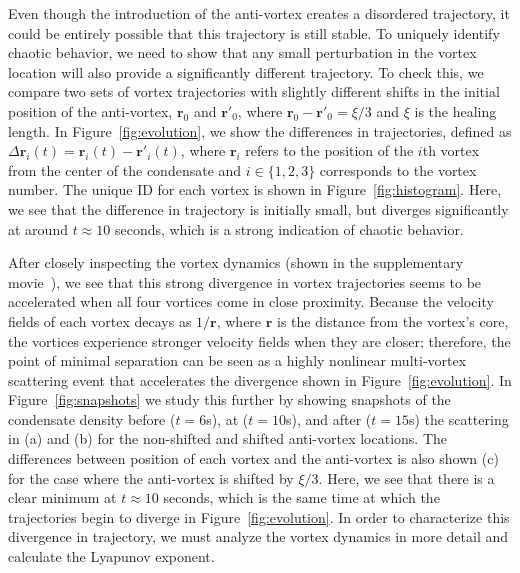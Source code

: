 Even though the introduction of the anti-vortex creates a disordered trajectory, it could be entirely possible that this trajectory is still stable.
To uniquely identify chaotic behavior, we need to show that any small perturbation in the vortex location will also provide a significantly different trajectory.
To check this, we compare two sets of vortex trajectories with slightly different shifts in the initial position of the anti-vortex, $\mathbf{r}_0$ and $\mathbf{r}'_0$, where $\mathbf{r}_0 - \mathbf{r}'_0 = \xi/3$ and $\xi$ is the healing length.
In Figure~\ref{fig:evolution}, we show the differences in trajectories, defined as $\Delta \mathbf{r}_i(t) = \mathbf{r}_{i}(t)-\mathbf{r}'_{i}(t)$, where $\mathbf{r}_i$ refers to the position of the $i$th vortex from the center of the condensate and $i\in \{1,2,3\}$ corresponds to the vortex number.
The unique ID for each vortex is shown in Figure~\ref{fig:histogram}.
Here, we see that the difference in trajectory is initially small, but diverges significantly at around $t \approx 10$ seconds, which is a strong indication of chaotic behavior.

After closely inspecting the vortex dynamics (shown in the supplementary movie~\cite{movie}), we see that this strong divergence in vortex trajectories seems to be accelerated when all four vortices come in close proximity.
Because the velocity fields of each vortex decays as $1/\mathbf{r}$, where $\mathbf{r}$ is the distance from the vortex's core, the vortices experience stronger velocity fields when they are closer; therefore, the point of minimal separation can be seen as a highly nonlinear multi-vortex scattering event that accelerates the divergence shown in Figure~\ref{fig:evolution}.
In Figure~\ref{fig:snapshots} we study this further by showing snapshots of the condensate density before ($t = 6$s), at ($t = 10$s), and after ($t = 15$s) the scattering in (a) and (b) for the non-shifted and shifted anti-vortex locations.
The differences between position of each vortex and the anti-vortex is also shown (c) for the case where the anti-vortex is shifted by $\xi/3$.
Here, we see that there is a clear minimum at $t \approx 10$ seconds, which is the same time at which the  trajectories begin to diverge in Figure~\ref{fig:evolution}.
In order to characterize this divergence in trajectory, we must analyze the vortex dynamics in more detail and calculate the Lyapunov exponent.

